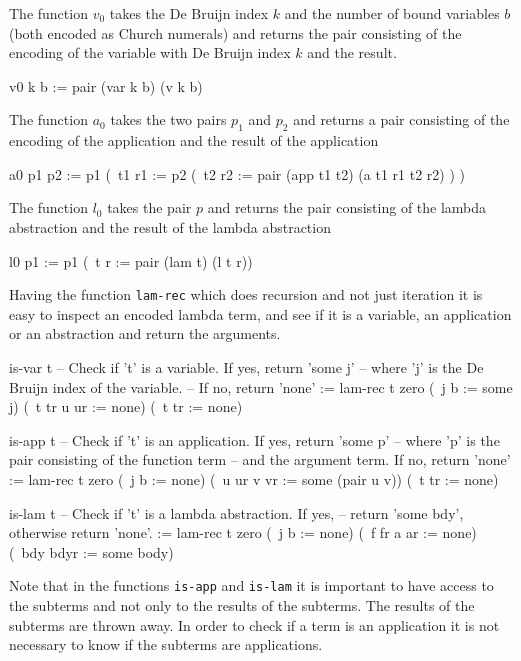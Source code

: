 \documentclass[12pt]{article}
\begin{document}
The function $v_0$ takes the De Bruijn index $k$ and the number of bound
variables $b$ (both encoded as Church numerals) and returns the pair consisting
of the encoding of the variable with De Bruijn index $k$ and the result.
\begin{lam}
    v0 k b :=
        pair (var k b) (v k b)
\end{lam}

The function $a_0$ takes the two pairs $p_1$ and $p_2$ and returns a pair
consisting of the encoding of the application and the result of the application
\begin{lam}
    a0 p1 p2 :=
        p1 (\ t1 r1 :=
                p2 (\ t2 r2 :=
                        pair (app t1 t2) (a t1 r1 t2 r2)
                   )
           )
\end{lam}

The function $l_0$ takes the pair $p$ and returns the pair consisting of the
lambda abstraction and the result of the lambda abstraction
\begin{lam}
    l0 p1 :=
        p1 (\ t r := pair (lam t) (l t r))
\end{lam}




Having the function {\tt lam-rec} which does recursion and not just iteration it
is easy to inspect an encoded lambda term, and see if it is a variable, an
application or an abstraction and return the arguments.

\begin{lam}
    is-var t
        -- Check if 't' is a variable. If yes, return 'some j'
        -- where 'j' is the De Bruijn index of the variable.
        -- If no, return 'none'
    :=
        lam-rec t zero
            (\ j b        := some j)
            (\ t tr u ur  := none)
            (\ t tr       := none)


    is-app t
        -- Check if 't' is an application. If yes, return 'some p'
        -- where 'p' is the pair consisting of the function term
        -- and the argument term. If no, return 'none'
    :=
        lam-rec t zero
            (\ j b := none)
            (\ u ur v vr := some (pair u v))
            (\ t tr := none)


    is-lam t
        -- Check if 't' is a lambda abstraction. If yes,
        -- return 'some bdy', otherwise return 'none'.
    :=
        lam-rec t zero
            (\ j b       := none)
            (\ f fr a ar := none)
            (\ bdy bdyr  := some body)
\end{lam}
Note that in the functions {\tt is-app} and {\tt is-lam} it is important to have
access to the subterms and not only to the results of the subterms. The results
of the subterms are thrown away. In order to check if a term is an application
it is not necessary to know if the subterms are applications.
\end{document}
